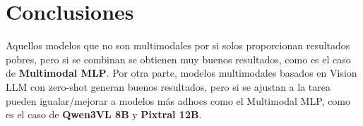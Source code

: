 \documentclass[11pt,a4paper]{article}
\begin{document}
\section{Conclusiones}
	Aquellos modelos que no son multimodales por si solos proporcionan resultados pobres, pero si se combinan se obtienen muy buenos resultados, como es el caso de \textbf{Multimodal MLP}. Por otra parte, modelos multimodales basados en Vision LLM con zero-shot generan buenos resultados, pero si se ajustan a la tarea pueden igualar/mejorar a modelos más adhocs como el Multimodal MLP, como es el caso de \textbf{Qwen3VL 8B} y \textbf{Pixtral 12B}.
\end{document}
